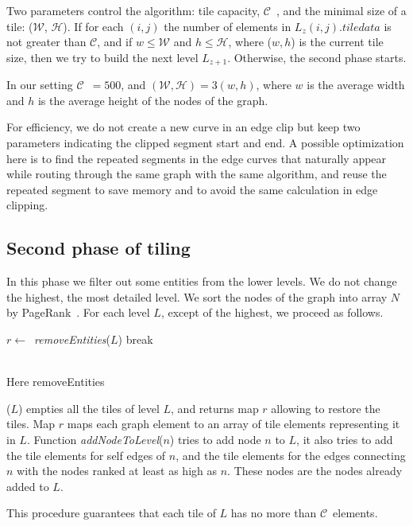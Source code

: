 \documentclass{llncs}
\newcommand{\capac}{$\mathcal{C}$}
\newcommand{\mw}{$\mathcal{W}$}
\newcommand{\mh}{$\mathcal{H}$}
\begin{document}
{Two parameters control the algorithm: tile capacity, \capac~, and the minimal size of a tile: (\mw, \mh).
If for each $(i,j)$ the number of elements in $L_z(i,j).\textit{tiledata}$ is not greater than \capac, and if $w \leq \mathcal{W}$ and $h \leq \mathcal{H}$, where ($w,h$) is the current tile size, then we try to build the next level  $L_{z+1}$. Otherwise, the second phase starts.

In our setting \capac~$=500$, and $(\mathcal{W},\mathcal{H}) = 3(w,h)$, where $w$ is the average width and $h$ is the average height of the nodes of the graph.

For efficiency, we do not create a new curve in an edge clip but keep two parameters indicating the clipped segment start and end.
A possible optimization here is to find the repeated segments in the edge curves that naturally appear
while routing through the same graph with the same algorithm, and reuse the repeated segment to save memory and to avoid the same calculation in edge clipping.

\subsection{Second phase of tiling}
In this phase we filter out some entities from the lower levels. We do not change the highest, the most detailed level.
We sort the nodes of the graph into array $N$ by PageRank~\cite{page1999pagerank}. For each level $L$, except of the highest, we proceed as follows.
\begin{algorithm}
  \begin{algorithmic}[1]
    \State $r \gets$~\textit{removeEntities}($L$)
    {break}
    \EndIf
    \EndFor
    \EndProcedure
  \end{algorithmic}
\end{algorithm}\\
Here removeEntities}($L$) empties all the tiles of level $L$, and returns map $r$ allowing to restore the tiles.
Map $r$ maps each graph element to an array of tile elements representing it in $L$. Function \textit{addNodeToLevel}($n$) tries to add node $n$ to $L$, it also tries to add the tile elements for self edges of $n$, and the tile elements for the edges connecting $n$ with the nodes ranked at least as high as $n$. These nodes are the nodes already added to $L$.

This procedure guarantees that each tile of $L$ has no more than \capac~elements.
\end{document}
